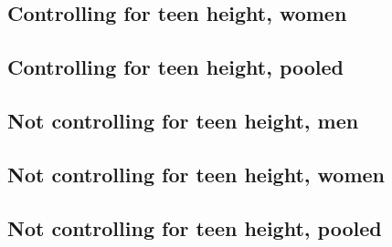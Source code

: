 \begin{landscape}
\subsection{Controlling for teen height, women}

\end{landscape}

\begin{landscape}
\subsection{Controlling for teen height, pooled}

\end{landscape}

\begin{landscape}
\subsection{Not controlling for teen height, men}

\end{landscape}

\begin{landscape}
\subsection{Not controlling for teen height, women}

\end{landscape}

\begin{landscape}
\subsection{Not controlling for teen height, pooled}

\end{landscape}